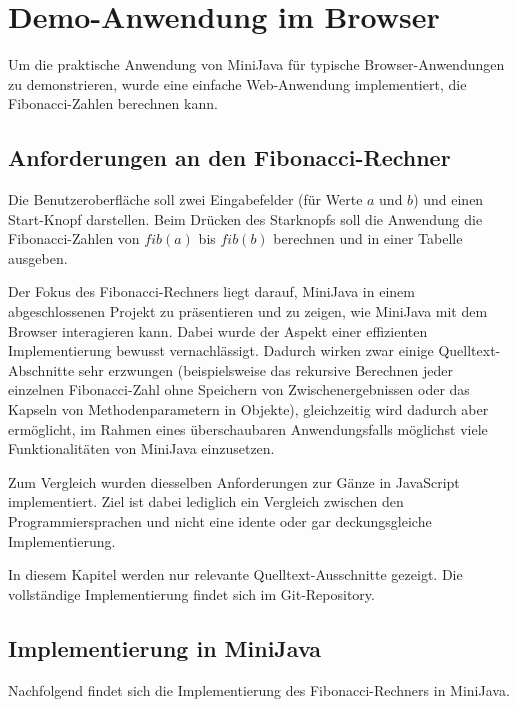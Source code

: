 \chapter{Demo-Anwendung im Browser}
\label{cha:DemoAnwendung}

Um die praktische Anwendung von MiniJava für typische Browser-Anwendungen zu demonstrieren, wurde eine einfache Web-Anwendung implementiert, die Fibonacci-Zahlen berechnen kann.

\section{Anforderungen an den Fibonacci-Rechner}
Die Benutzeroberfläche soll zwei Eingabefelder (für Werte $a$ und $b$) und einen Start-Knopf darstellen. Beim Drücken des Starknopfs soll die Anwendung die Fibonacci-Zahlen von $fib(a)$ bis $fib(b)$ berechnen und in einer Tabelle ausgeben.

Der Fokus des Fibonacci-Rechners liegt darauf, MiniJava in einem abgeschlossenen Projekt zu präsentieren und zu zeigen, wie MiniJava mit dem Browser interagieren kann. Dabei wurde der Aspekt einer effizienten Implementierung bewusst vernachlässigt. Dadurch wirken zwar einige Quelltext-Abschnitte sehr erzwungen (beispielsweise das rekursive Berechnen jeder einzelnen Fibonacci-Zahl ohne Speichern von Zwischenergebnissen oder das Kapseln von Methodenparametern in Objekte), gleichzeitig wird dadurch aber ermöglicht, im Rahmen eines überschaubaren Anwendungsfalls möglichst viele Funktionalitäten von MiniJava einzusetzen.

Zum Vergleich wurden diesselben Anforderungen zur Gänze in JavaScript implementiert. Ziel ist dabei lediglich ein Vergleich zwischen den Programmiersprachen und nicht eine idente oder gar deckungsgleiche Implementierung.

In diesem Kapitel werden nur relevante Quelltext-Ausschnitte gezeigt. Die vollständige Implementierung findet sich im Git-Repository.

\pagebreak
\section{Implementierung in MiniJava}

Nachfolgend findet sich die Implementierung des Fibonacci-Rechners in MiniJava.

\pagebreak



